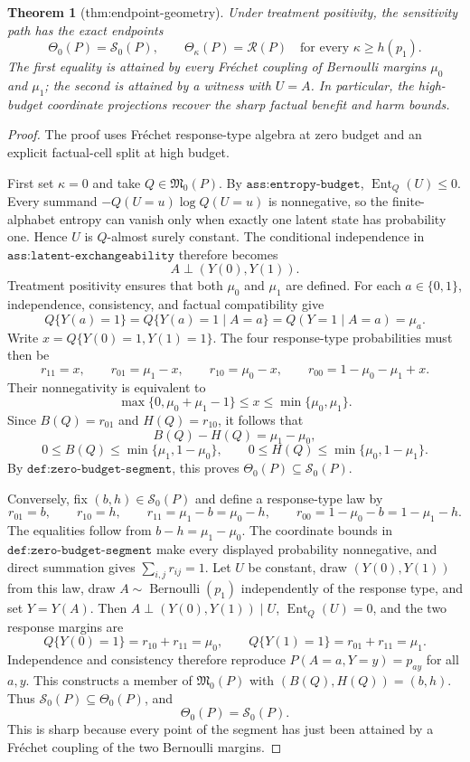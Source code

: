 \documentclass{article}
\newtheorem{theorem}{Theorem}
\begin{document}
\begin{theorem}[thm:endpoint-geometry]\label{thm:endpoint-geometry}
Under treatment positivity, the sensitivity path has the exact endpoints \[\Theta_0(P)=\mathcal S_0(P),\qquad \Theta_\kappa(P)=\mathcal R(P)\quad\text{for every }\kappa\geq h(p_1).\] The first equality is attained by every Fréchet coupling of Bernoulli margins \(\mu_0\) and \(\mu_1\); the second is attained by a witness with \(U=A\). In particular, the high-budget coordinate projections recover the sharp factual benefit and harm bounds.
\end{theorem}
\begin{proof}
The proof uses Fr\'echet response-type algebra at zero budget and an explicit factual-cell split at high budget.

First set \(\kappa=0\) and take \(Q\in\mathfrak M_0(P)\). By \(\texttt{ass:entropy-budget}\), \(\operatorname{Ent}_Q(U)\leq0\). Every summand \(-Q(U=u)\log Q(U=u)\) is nonnegative, so the finite-alphabet entropy can vanish only when exactly one latent state has probability one. Hence \(U\) is \(Q\)-almost surely constant. The conditional independence in \(\texttt{ass:latent-exchangeability}\) therefore becomes
\[
A\perp (Y(0),Y(1)).
\]
Treatment positivity ensures that both \(\mu_0\) and \(\mu_1\) are defined. For each \(a\in\{0,1\}\), independence, consistency, and factual compatibility give
\[
Q\{Y(a)=1\}
=Q\{Y(a)=1\mid A=a\}
=Q(Y=1\mid A=a)
=\mu_a.
\]
Write \(x=Q\{Y(0)=1,Y(1)=1\}\). The four response-type probabilities must then be
\[
r_{11}=x,\qquad
r_{01}=\mu_1-x,\qquad
r_{10}=\mu_0-x,\qquad
r_{00}=1-\mu_0-\mu_1+x.
\]
Their nonnegativity is equivalent to
\[
\max\{0,\mu_0+\mu_1-1\}\leq x\leq\min\{\mu_0,\mu_1\}.
\]
Since \(B(Q)=r_{01}\) and \(H(Q)=r_{10}\), it follows that
\[
B(Q)-H(Q)=\mu_1-\mu_0,
\]
\[
0\leq B(Q)\leq\min\{\mu_1,1-\mu_0\},\qquad
0\leq H(Q)\leq\min\{\mu_0,1-\mu_1\}.
\]
By \(\texttt{def:zero-budget-segment}\), this proves \(\Theta_0(P)\subseteq\mathcal S_0(P)\).

Conversely, fix \((b,h)\in\mathcal S_0(P)\) and define a response-type law by
\[
r_{01}=b,\qquad r_{10}=h,\qquad
r_{11}=\mu_1-b=\mu_0-h,\qquad
r_{00}=1-\mu_0-b=1-\mu_1-h.
\]
The equalities follow from \(b-h=\mu_1-\mu_0\). The coordinate bounds in \(\texttt{def:zero-budget-segment}\) make every displayed probability nonnegative, and direct summation gives \(\sum_{i,j}r_{ij}=1\). Let \(U\) be constant, draw \((Y(0),Y(1))\) from this law, draw \(A\sim\operatorname{Bernoulli}(p_1)\) independently of the response type, and set \(Y=Y(A)\). Then \(A\perp(Y(0),Y(1))\mid U\), \(\operatorname{Ent}_Q(U)=0\), and the two response margins are
\[
Q\{Y(0)=1\}=r_{10}+r_{11}=\mu_0,
\qquad
Q\{Y(1)=1\}=r_{01}+r_{11}=\mu_1.
\]
Independence and consistency therefore reproduce \(P(A=a,Y=y)=p_{ay}\) for all \(a,y\). This constructs a member of \(\mathfrak M_0(P)\) with \((B(Q),H(Q))=(b,h)\). Thus \(\mathcal S_0(P)\subseteq\Theta_0(P)\), and
\[
\Theta_0(P)=\mathcal S_0(P).
\]
This is sharp because every point of the segment has just been attained by a Fr\'echet coupling of the two Bernoulli margins.


\end{proof}
\end{document}
